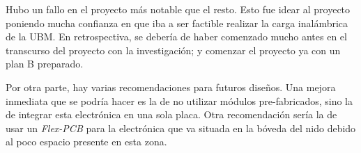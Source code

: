 Hubo un fallo en el proyecto más notable que el resto. Esto fue idear al proyecto poniendo mucha confianza en que iba a ser factible realizar la carga inalámbrica de la UBM. En retrospectiva, se debería de haber comenzado mucho antes en el transcurso del proyecto con la investigación; y comenzar el proyecto ya con un plan B preparado. 

Por otra parte, hay varias recomendaciones para futuros diseños. Una mejora inmediata que se podría hacer es la de no utilizar módulos pre-fabricados, sino la de integrar esta electrónica en una sola placa. Otra recomendación sería la de usar un \textit{Flex-PCB} para la electrónica que va situada en la bóveda del nido debido al poco espacio presente en esta zona.
